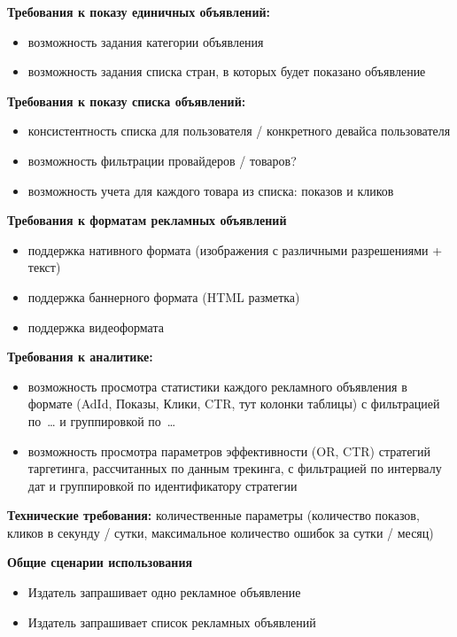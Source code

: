 \documentclass[specification,annotation,times]{itmo-student-thesis}
\begin{document}
\textbf{Требования к показу единичных объявлений:}
\begin{itemize}
	\item возможность задания категории объявления
	\item возможность задания списка стран, в которых будет показано объявление
\end{itemize}

\textbf{Требования к показу списка объявлений:}
\begin{itemize}
	\item консистентность списка для пользователя / конкретного девайса пользователя
	\item возможность фильтрации провайдеров / товаров?
	\item возможность учета для каждого товара из списка: показов и кликов
\end{itemize}

\textbf{Требования к форматам рекламных объявлений}
\begin{itemize}
	\item поддержка нативного формата (изображения с различными разрешениями + текст)
	\item поддержка баннерного формата (HTML разметка)
	\item поддержка видеоформата
\end{itemize}

\textbf{Требования к аналитике:}
\begin{itemize}
	\item возможность просмотра статистики каждого рекламного объявления в формате (AdId, Показы, Клики, CTR, тут колонки таблицы) с фильтрацией по … и группировкой по …
	\item возможность просмотра параметров эффективности (OR, CTR) стратегий таргетинга, рассчитанных по данным трекинга, с фильтрацией по интервалу дат и группировкой по идентификатору стратегии
\end{itemize}

\textbf{Технические требования:} количественные параметры (количество показов, кликов в секунду / сутки, максимальное количество ошибок за сутки / месяц)

\textbf{Общие сценарии использования}
\begin{itemize}
	\item Издатель запрашивает одно рекламное объявление
	\item Издатель запрашивает список рекламных объявлений
\end{itemize}
\end{document}
